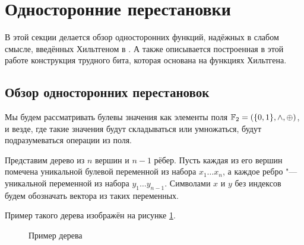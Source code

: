 \documentclass[a4paper, 14pt]{extarticle}
\begin{document}
\section{Односторонние перестановки}
\label{sec_hiltgen}

В этой секции делается обзор односторонних функций, надёжных в слабом смысле,
введённых Хильтгеном в \cite{hiltgen1993}. А также описывается построенная в
этой работе конструкция трудного бита, которая основана на функциях Хильтгена.

\subsection{Обзор односторонних перестановок}

Мы будем рассматривать булевы значения как элементы поля ${\mathbb F}_2 = (\{0, 1\}, \land,
\oplus)$, и везде, где такие значения будут складываться или умножаться, будут
подразумеваться операции из поля.

Представим дерево из $n$ вершин и $n - 1$ рёбер. Пусть каждая из его вершин
помечена уникальной булевой переменной из набора $x_1 \dots x_n$, а каждое ребро
"--- уникальной переменной из набора $y_1 \dots y_{n-1}$. Символами $x$ и $y$ без
индексов будем обозначать вектора из таких переменных.

Пример такого дерева изображён на рисунке \ref{fig_tree}.

\begin{figure}[h]
\centering
{}
\caption{Пример дерева}
\label{fig_tree}
\end{figure}
\end{document}
